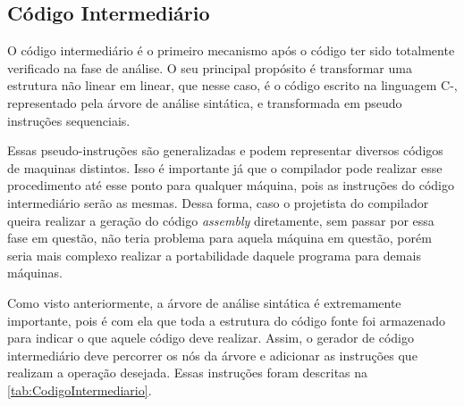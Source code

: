 \documentclass[
	12pt,				%
	oneside,
	a4paper,			%
	english,			%
	french,				%
	spanish,			%
	brazil,				%
	]{abntex2}
\begin{document}
\subsection{Código Intermediário}

O código intermediário é o primeiro mecanismo após o código ter sido totalmente verificado na fase de análise. O seu principal propósito é transformar uma estrutura não linear em linear, que nesse caso, é o código escrito na linguagem C-, representado pela árvore de análise sintática, e transformada em pseudo instruções sequenciais.

Essas pseudo-instruções são generalizadas e podem representar diversos códigos de maquinas distintos. Isso é importante já que o compilador pode realizar esse procedimento até esse ponto para qualquer máquina, pois as instruções do código intermediário serão as mesmas. Dessa forma, caso o projetista do compilador queira realizar a geração do código \emph{assembly} diretamente, sem passar por essa fase em questão, não teria problema para aquela máquina em questão, porém seria mais complexo realizar a portabilidade daquele programa para demais máquinas.

Como visto anteriormente, a árvore de análise sintática é extremamente importante, pois é com ela que toda a estrutura do código fonte foi armazenado para indicar o que aquele código deve realizar. Assim, o gerador de código intermediário deve percorrer os nós da árvore e adicionar as instruções que realizam a operação desejada. Essas instruções foram descritas na \autoref{tab:CodigoIntermediario}.
\end{document}

